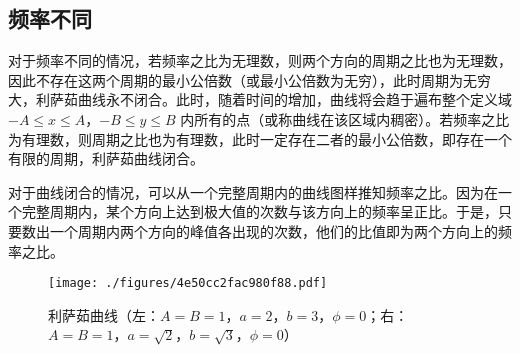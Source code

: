 \subsection{频率不同}
对于频率不同的情况，若频率之比为无理数，则两个方向的周期之比也为无理数，因此不存在这两个周期的最小公倍数（或最小公倍数为无穷），此时周期为无穷大，利萨茹曲线永不闭合。此时，随着时间的增加，曲线将会趋于遍布整个定义域 $-A\leqslant x \leqslant A$，$-B \leqslant y \leqslant B$ 内所有的点（或称曲线在该区域内稠密）。若频率之比为有理数，则周期之比也为有理数，此时一定存在二者的最小公倍数，即存在一个有限的周期，利萨茹曲线闭合。

对于曲线闭合的情况，可以从一个完整周期内的曲线图样推知频率之比。因为在一个完整周期内，某个方向上达到极大值的次数与该方向上的频率呈正比。于是，只要数出一个周期内两个方向的峰值各出现的次数，他们的比值即为两个方向上的频率之比。
\begin{figure}[ht]
\centering
\texttt{[image: ./figures/4e50cc2fac980f88.pdf]}
\caption{利萨茹曲线（左：$A=B=1$，$a=2$，$b=3$，$\phi=0$；右：$A=B=1$，$a=\sqrt 2$，$b=\sqrt 3$，$\phi=0$）} \label{fig_Lissaj_2}
\end{figure}
